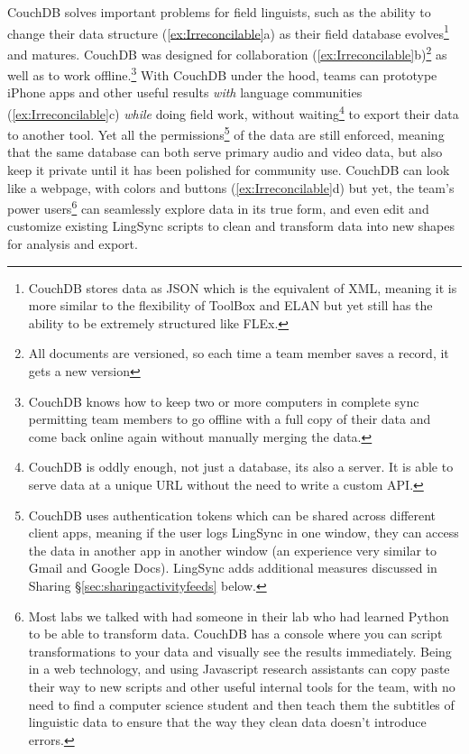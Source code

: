 \documentclass[letterpaper, 12pt, dvips]{mitwpl}
\begin{document}
CouchDB  solves important problems for field linguists, such as the ability to change their  data structure (\ref{ex:Irreconcilable}a) as their field database evolves\footnote{CouchDB stores data as JSON which is the equivalent of XML, meaning it is more similar to the flexibility of ToolBox and ELAN but yet still has the ability to be extremely structured like FLEx.} 
and matures. CouchDB was designed for collaboration  (\ref{ex:Irreconcilable}b)\footnote{All documents are versioned, so each time a team member saves a record, it gets a new version} 
as well as to work offline.\footnote{CouchDB knows how to keep two or more computers in complete sync permitting team members to go offline with a full copy of their data and come back online again without manually merging the data.}
 With CouchDB under the hood, teams can prototype iPhone apps  and other useful results \emph{with} language communities (\ref{ex:Irreconcilable}c) \emph{while} doing field work, without waiting\footnote{CouchDB is oddly enough, not just a database, its also a server. It is able to serve data at a unique URL without the need to write a custom API.}
  to export their data to another tool. Yet all the permissions\footnote{CouchDB uses authentication tokens which can be shared across different client apps, meaning if the user logs LingSync in one window, they can access the data in another app in another window (an experience very similar to Gmail and Google Docs). LingSync adds additional measures discussed in Sharing \S \ref{sec:sharingactivityfeeds} below.}
 of the data are still enforced, meaning that the same database can both serve primary audio and video \citep{Pfeiffer:2010} data, but also keep it private until it has been polished for community use. CouchDB can look like a webpage, with colors and buttons (\ref{ex:Irreconcilable}d) but yet, the team's power users\footnote{Most labs we talked with had someone in their lab who had learned Python to be able to transform data. CouchDB has a console where you can script transformations to your data and visually see the results immediately. Being in a web technology, and using Javascript research assistants can copy paste their way to new scripts and other useful internal tools for the team, with no need to find a computer science student and then teach them the subtitles of linguistic data to ensure that the way they clean data doesn't introduce errors. } 
 can seamlessly explore data in its true form, and even edit and customize existing LingSync scripts to clean and transform data into new shapes for analysis and export.
\end{document}
